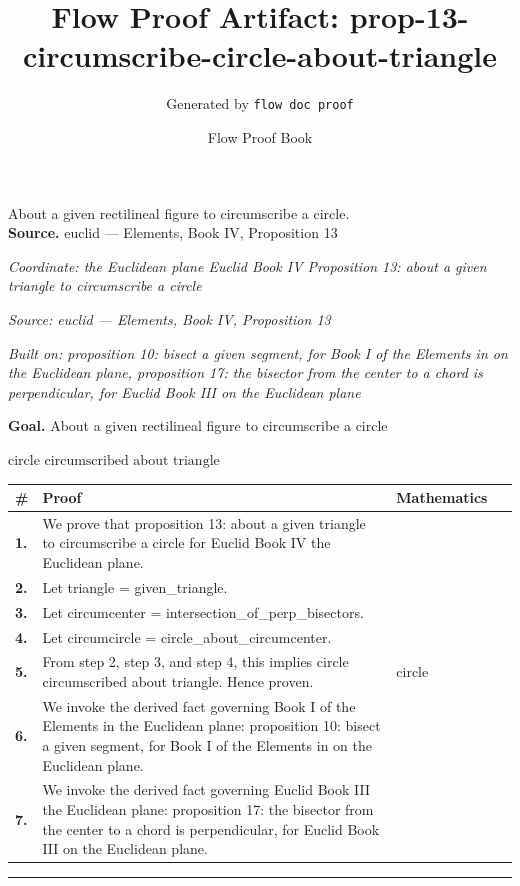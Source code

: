 \documentclass[11pt]{article}
\title{Flow Proof Artifact: prop-13-circumscribe-circle-about-triangle}
\author{Generated by \texttt{flow doc proof}}
\date{Flow Proof Book}
\theoremstyle{definition}
\begin{document}
\maketitle
About a given rectilineal figure to circumscribe a circle.\\[0.5em]
\textbf{Source.} euclid — Elements, Book IV, Proposition 13\\[0.5em]
\bigskip
{}\par
\smallskip\noindent\textit{Coordinate: the Euclidean plane \cdot Euclid Book IV \cdot Proposition 13: about a given triangle to circumscribe a circle}\par
\smallskip\noindent\textit{Source: euclid — Elements, Book IV, Proposition 13}\par
\smallskip\noindent\textit{Built on: proposition 10: bisect a given segment, for Book I of the Elements in on the Euclidean plane, proposition 17: the bisector from the center to a chord is perpendicular, for Euclid Book III on the Euclidean plane}\par
\medskip
\noindent\textbf{Goal.} About a given rectilineal figure to circumscribe a circle\par
\noindent$\displaystyle \text{circle circumscribed about triangle}$\par
\medskip
\noindent
\begin{tabular}{@{} >{\raggedright\arraybackslash}p{} >{\raggedright\arraybackslash}p{} >{\raggedleft\arraybackslash}p{} @{}}
\textbf{\#} & \textbf{Proof} & \textbf{Mathematics} \\
\midrule
\textbf{1.} & We prove that proposition 13: about a given triangle to circumscribe a circle for Euclid Book IV the Euclidean plane. & \\[0.45em]
\textbf{2.} & Let triangle = given\_triangle. & \\[0.45em]
\textbf{3.} & Let circumcenter = intersection\_of\_perp\_bisectors. & \\[0.45em]
\textbf{4.} & Let circumcircle = circle\_about\_circumcenter. & \\[0.45em]
\textbf{5.} & From step 2, step 3, and step 4, this implies circle circumscribed about triangle. Hence proven. & $\displaystyle \text{circle circumscribed about triangle}$ \\[0.45em]
\textbf{6.} & We invoke the derived fact governing Book I of the Elements in the Euclidean plane: proposition 10: bisect a given segment, for Book I of the Elements in on the Euclidean plane. & \\[0.45em]
\textbf{7.} & We invoke the derived fact governing Euclid Book III the Euclidean plane: proposition 17: the bisector from the center to a chord is perpendicular, for Euclid Book III on the Euclidean plane. & \\[0.45em]
\bottomrule
\end{tabular}
\label{thm:Geometry-Euclid Book IV-proposition_13_about_a_given_triangle_to_circumscribe_a_circle}
\par\medskip\hrule
\end{document}
